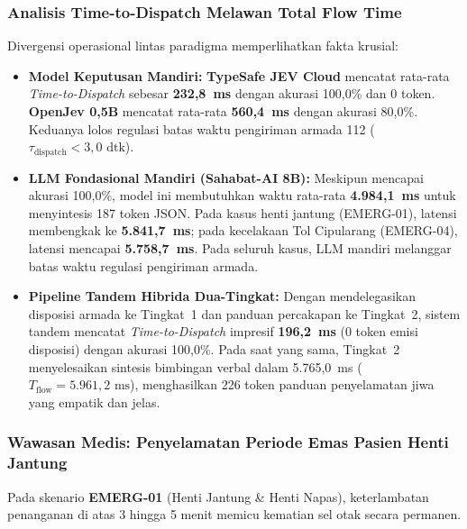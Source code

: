 \documentclass[journal,compsoc]{IEEEtran}
\begin{document}
\subsubsection{Analisis Time-to-Dispatch Melawan Total Flow Time}
Divergensi operasional lintas paradigma memperlihatkan fakta krusial:
\begin{itemize}
    \item \textbf{Model Keputusan Mandiri:} \textbf{TypeSafe JEV Cloud} mencatat rata-rata \textit{Time-to-Dispatch} sebesar \textbf{232,8~ms} dengan akurasi 100,0\% dan 0 token. \textbf{OpenJev 0,5B} mencatat rata-rata \textbf{560,4~ms} dengan akurasi 80,0\%. Keduanya lolos regulasi batas waktu pengiriman armada 112 ($\tau_{\text{dispatch}} < 3{,}0 \text{ dtk}$).
    \item \textbf{LLM Fondasional Mandiri (Sahabat-AI 8B):} Meskipun mencapai akurasi 100,0\%, model ini membutuhkan waktu rata-rata \textbf{4.984,1~ms} untuk menyintesis 187 token JSON. Pada kasus henti jantung (EMERG-01), latensi membengkak ke \textbf{5.841,7~ms}; pada kecelakaan Tol Cipularang (EMERG-04), latensi mencapai \textbf{5.758,7~ms}. Pada seluruh kasus, LLM mandiri melanggar batas waktu regulasi pengiriman armada.
    \item \textbf{Pipeline Tandem Hibrida Dua-Tingkat:} Dengan mendelegasikan disposisi armada ke Tingkat~1 dan panduan percakapan ke Tingkat~2, sistem tandem mencatat \textit{Time-to-Dispatch} impresif \textbf{196,2~ms} (0 token emisi disposisi) dengan akurasi 100,0\%. Pada saat yang sama, Tingkat~2 menyelesaikan sintesis bimbingan verbal dalam 5.765,0~ms ($T_{\text{flow}} = 5.961{,}2 \text{ ms}$), menghasilkan 226 token panduan penyelamatan jiwa yang empatik dan jelas.
\end{itemize}

\subsubsection{Wawasan Medis: Penyelamatan Periode Emas Pasien Henti Jantung}
Pada skenario \textbf{EMERG-01} (Henti Jantung \& Henti Napas), keterlambatan penanganan di atas 3 hingga 5 menit memicu kematian sel otak secara permanen.
\end{document}
